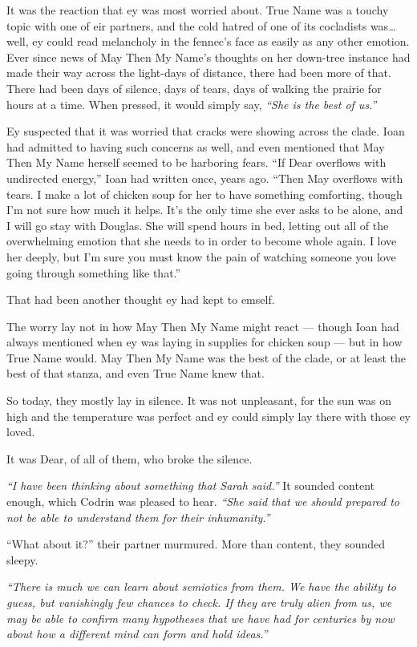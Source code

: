 It was the reaction that ey was most worried about. True Name was a touchy topic with one of eir partners, and the cold hatred of one of its cocladists was\ldots well, ey could read melancholy in the fennec's face as easily as any other emotion. Ever since news of May Then My Name's thoughts on her down-tree instance had made their way across the light-days of distance, there had been more of that. There had been days of silence, days of tears, days of walking the prairie for hours at a time. When pressed, it would simply say, \emph{``She is the best of us.''}

Ey suspected that it was worried that cracks were showing across the clade. Ioan had admitted to having such concerns as well, and even mentioned that May Then My Name herself seemed to be harboring fears. ``If Dear overflows with undirected energy,'' Ioan had written once, years ago. ``Then May overflows with tears. I make a lot of chicken soup for her to have something comforting, though I'm not sure how much it helps. It's the only time she ever asks to be alone, and I will go stay with Douglas. She will spend hours in bed, letting out all of the overwhelming emotion that she needs to in order to become whole again. I love her deeply, but I'm sure you must know the pain of watching someone you love going through something like that.''

That had been another thought ey had kept to emself.

The worry lay not in how May Then My Name might react — though Ioan had always mentioned when ey was laying in supplies for chicken soup — but in how True Name would. May Then My Name was the best of the clade, or at least the best of that stanza, and even True Name knew that.

So today, they mostly lay in silence. It was not unpleasant, for the sun was on high and the temperature was perfect and ey could simply lay there with those ey loved.

It was Dear, of all of them, who broke the silence.

\emph{``I have been thinking about something that Sarah said.''} It sounded content enough, which Codrin was pleased to hear. \emph{``She said that we should prepared to not be able to understand them for their inhumanity.''}

``What about it?'' their partner murmured. More than content, they sounded sleepy.

\emph{``There is much we can learn about semiotics from them. We have the ability to guess, but vanishingly few chances to check. If they are truly alien from us, we may be able to confirm many hypotheses that we have had for centuries by now about how a different mind can form and hold ideas.''}

